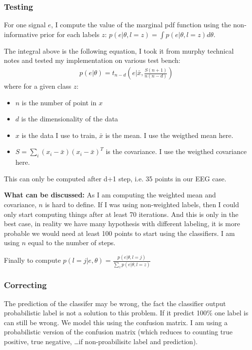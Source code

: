 \subsubsection{Testing}

For one signal $e$, I compute the value of the marginal pdf function using the non-informative prior for each labels $z$: $p(e|\theta, l=z) = \int p(e|\theta, l=z) d\theta$.

The integral above is the following equation, I took it from murphy technical notes and tested my implementation on various test bench:
\begin{eqnarray}
p(e|\theta) = t_{n-d}(e | \bar{x}, \frac{S (n+1)}{n(n-d)})
\end{eqnarray}
where for a given class $z$:\\
\begin{itemize}
\item $n$ is the number of point in $x$
\item $d$ is the dimensionality of the data
\item $x$ is the data I use to train, $\bar{x}$ is the mean. I use the weigthed mean here.
\item $S = \sum_{i} (x_i - \bar{x}) (x_i - \bar{x})^T$ is the covariance. I use the weigthed covariance here.
\end{itemize}
This can only be computed after d+1 step, i.e. 35 points in our EEG case.

\textbf{What can be discussed:} As I am computing the weighted mean and covariance, $n$ is hard to define. If I was using non-weighted labels, then I could only start computing things after at least 70 iterations. And this is only in the best case, in reality we have many hypothesis with different labeling, it is more probable we would need at least 100 points to start using the classifiers. I am using $n$ equal to the number of steps. 


Finally to compute $p(l = j | e, \theta) = \frac{p(e|\theta, l=j)}{\sum_z p(e|\theta, l=z)}$

\subsubsection{Correcting}

The prediction of the classifer may be wrong, the fact the classifier output probabilistic label is not a solution to this problem. If it predict 100\% one label is can still be wrong. We model this using the confusion matrix. I am using a probabilistic version of the confusion matrix (which reduces to counting true positive, true negative, \ldots if non-proabilisitc label and prediction).

